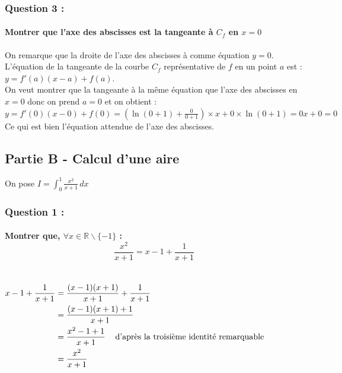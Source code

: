 \documentclass[a4paper, 12pt]{article}
\begin{document}
{}
\subsubsection*{Question 3 :}
\paragraph*{Montrer que l'axe des abscisses est la tangeante à $C_f$ en $x=0$ \\[5mm]}

On remarque que la droite de l'axe des abscisses à comme équation $y = 0$.
\\
L'équation de la tangeante de la courbe $C_f$ représentative de $f$ en un point $a$ est : 
$y = f'(a)(x-a) + f(a)$.
\\[2mm]
On veut montrer que la tangeante à la même équation que l'axe des abscisses en $x=0$ donc on prend $a=0$ et on obtient :
\\
$y = f'(0)(x-0) + f(0) = (\ln{\left( 0 + 1 \right)} + \frac{0}{0+1})\times x + 0 \times \ln{\left( 0 + 1 \right)}= 0x + 0 = 0$
\\[2mm]
Ce qui est bien l'équation attendue de l'axe des abscisses.

{}
\subsection*{Partie B - Calcul d'une aire}
\noindent
On pose $I = \displaystyle \int_{0}^{1} \frac{x^2}{x+1} \,dx$

{}
\subsubsection*{Question 1 :}
\paragraph*{Montrer que, $\forall x \in \mathbb{R} \backslash \{-1\}$ : \[  \frac{x^2}{x+1}=x-1 + \frac{1}{x+1}\] \\[5mm]}

$
\begin{aligned}
    x-1 + \frac{1}{x+1} 
    &= \frac{(x-1)(x+1)}{x+1}+\frac{1}{x+1} \\
    &= \frac{(x-1)(x+1) + 1}{x+1} \\
    &= \frac{x^2-1+1}{x+1} \text{\hspace{3mm} d'après la troisième identité remarquable} \\
    &= \frac{x^2}{x+1}
\end{aligned}
$
{}
\end{document}
